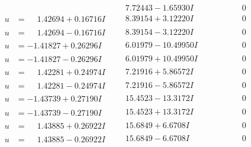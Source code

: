 \documentclass[1p]{elsarticle_modified}
\theoremstyle{definition}
\begin{document}
$$\begin{array}{c|c|c}
 & \phantom{-}7.72443 - 1.65930 I & \phantom{-0.000000 } 0 \\ \hline\begin{aligned}
u &= \phantom{-}1.42694 + 0.16716 I\end{aligned}
 & \phantom{-}8.39154 + 3.12220 I & \phantom{-0.000000 } 0 \\ \hline\begin{aligned}
u &= \phantom{-}1.42694 - 0.16716 I\end{aligned}
 & \phantom{-}8.39154 - 3.12220 I & \phantom{-0.000000 } 0 \\ \hline\begin{aligned}
u &= -1.41827 + 0.26296 I\end{aligned}
 & \phantom{-}6.01979 - 10.49950 I & \phantom{-0.000000 } 0 \\ \hline\begin{aligned}
u &= -1.41827 - 0.26296 I\end{aligned}
 & \phantom{-}6.01979 + 10.49950 I & \phantom{-0.000000 } 0 \\ \hline\begin{aligned}
u &= \phantom{-}1.42281 + 0.24974 I\end{aligned}
 & \phantom{-}7.21916 + 5.86572 I & \phantom{-0.000000 } 0 \\ \hline\begin{aligned}
u &= \phantom{-}1.42281 - 0.24974 I\end{aligned}
 & \phantom{-}7.21916 - 5.86572 I & \phantom{-0.000000 } 0 \\ \hline\begin{aligned}
u &= -1.43739 + 0.27190 I\end{aligned}
 & \phantom{-}15.4523 - 13.3172 I & \phantom{-0.000000 } 0 \\ \hline\begin{aligned}
u &= -1.43739 - 0.27190 I\end{aligned}
 & \phantom{-}15.4523 + 13.3172 I & \phantom{-0.000000 } 0 \\ \hline\begin{aligned}
u &= \phantom{-}1.43885 + 0.26922 I\end{aligned}
 & \phantom{-}15.6849 + 6.6708 I & \phantom{-0.000000 } 0 \\ \hline\begin{aligned}
u &= \phantom{-}1.43885 - 0.26922 I\end{aligned}
 & \phantom{-}15.6849 - 6.6708 I & \phantom{-0.000000 } 0 \\ \hline\begin{aligned}

\end{aligned}
\end{array}$$
\end{document}
